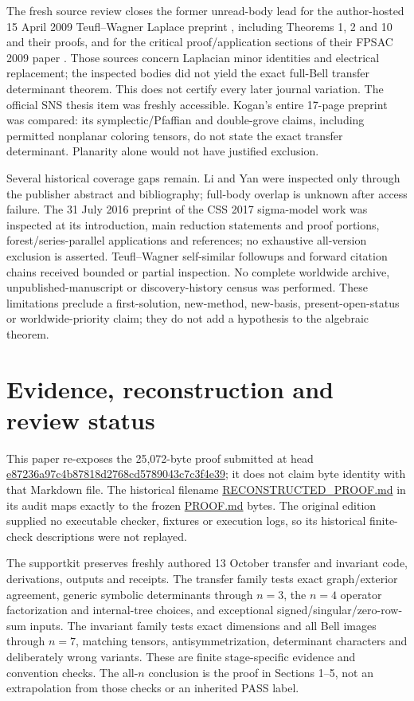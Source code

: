 \documentclass[11pt]{article}
\begin{document}
The fresh source review closes the former unread-body lead for the author-hosted 15 April 2009 Teufl--Wagner Laplace preprint \cite{TWLaplace}, including Theorems 1, 2 and 10 and their proofs, and for the critical proof/application sections of their FPSAC 2009 paper \cite{TWFPSAC}. Those sources concern Laplacian minor identities and electrical replacement; the inspected bodies did not yield the exact full-Bell transfer determinant theorem. This does not certify every later journal variation. The official SNS thesis item was freshly accessible. Kogan's entire 17-page preprint \cite{Kogan} was compared: its symplectic/Pfaffian and double-grove claims, including permitted nonplanar coloring tensors, do not state the exact transfer determinant. Planarity alone would not have justified exclusion.

Several historical coverage gaps remain. Li and Yan \cite{LiYan} were inspected only through the publisher abstract and bibliography; full-body overlap is unknown after access failure. The 31 July 2016 preprint of the CSS 2017 sigma-model work \cite{CSS2017} was inspected at its introduction, main reduction statements and proof portions, forest/series-parallel applications and references; no exhaustive all-version exclusion is asserted. Teufl--Wagner self-similar followups and forward citation chains received bounded or partial inspection. No complete worldwide archive, unpublished-manuscript or discovery-history census was performed. These limitations preclude a first-solution, new-method, new-basis, present-open-status or worldwide-priority claim; they do not add a hypothesis to the algebraic theorem.

\section{Evidence, reconstruction and review status}
This paper re-exposes the 25,072-byte proof submitted at head \url{e87236a97c4b87818d2768cd5789043c7c3f4e39}; it does not claim byte identity with that Markdown file. The historical filename \url{RECONSTRUCTED_PROOF.md} in its audit maps exactly to the frozen \url{PROOF.md} bytes. The original edition supplied no executable checker, fixtures or execution logs, so its historical finite-check descriptions were not replayed.

The supportkit preserves freshly authored 13 October transfer and invariant code, derivations, outputs and receipts. The transfer family tests exact graph/exterior agreement, generic symbolic determinants through $n=3$, the $n=4$ operator factorization and internal-tree choices, and exceptional signed/singular/zero-row-sum inputs. The invariant family tests exact dimensions and all Bell images through $n=7$, matching tensors, antisymmetrization, determinant characters and deliberately wrong variants. These are finite stage-specific evidence and convention checks. The all-$n$ conclusion is the proof in Sections 1--5, not an extrapolation from those checks or an inherited PASS label.
\end{document}
